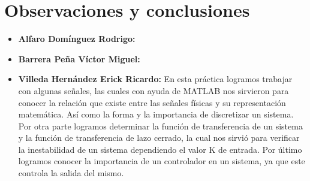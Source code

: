 \section{Observaciones y conclusiones}

\begin{itemize}
	\item \textbf{Alfaro Domínguez Rodrigo:}
	\item \textbf{Barrera Peña Víctor Miguel:} 
	\item \textbf{Villeda Hernández Erick Ricardo:}
	En esta práctica logramos trabajar con algunas señales, las cuales con ayuda de MATLAB nos sirvieron para conocer la relación que existe entre las señales físicas  y su representación matemática. Así como la forma y la importancia de discretizar un sistema. Por otra parte logramos determinar la función de transferencia de un sistema y la función de transferencia de lazo cerrado, la cual nos sirvió para verificar la inestabilidad de un sistema dependiendo el valor K de entrada. Por último logramos conocer la importancia de un controlador en un sistema, ya que este controla la salida del mismo.

	
\end{itemize}